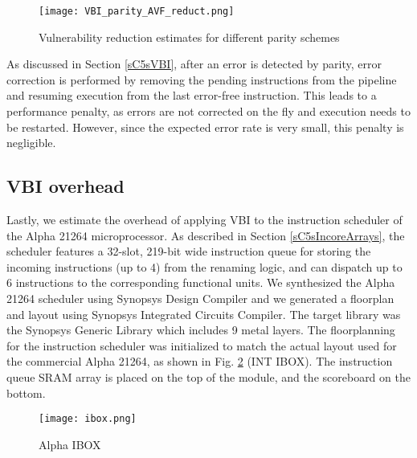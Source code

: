 \documentclass[12pt]{yalephd}
\begin{document}


\begin{figure}[!ht]%
\centering
\texttt{[image: VBI\_parity\_AVF\_reduct.png]}%
\caption{Vulnerability reduction estimates for different parity schemes}%
\label{sC5fVBIparityAVFreduct}%
\end{figure}

As discussed in Section \ref{sC5sVBI}, after an error is detected by parity, error correction is performed by removing the pending instructions from the pipeline and resuming execution from the last error-free instruction. This leads to a performance penalty, as errors are not corrected on the fly and execution needs to be restarted. However, since the expected error rate is very small, this penalty is negligible.

\subsection{VBI overhead}\label{sC5sVBIoverhead}

Lastly, we estimate the overhead of applying VBI to the instruction scheduler of the Alpha 21264 microprocessor. As described in Section \ref{sC5sIncoreArrays}, the scheduler features a 32-slot, 219-bit wide instruction queue for storing the incoming instructions (up to 4) from the renaming logic, and can dispatch up to 6 instructions to the corresponding functional units. We synthesized the Alpha 21264 scheduler using Synopsys Design Compiler and we generated a floorplan and layout using Synopsys Integrated Circuits Compiler. The target library was the Synopsys Generic Library which includes 9 metal layers. The floorplanning for the instruction scheduler was initialized to match the actual layout used for the commercial Alpha 21264, as shown in Fig. \ref{sC5fAlphaIBOX} (INT IBOX). The instruction queue SRAM array is placed on the top of the module, and the scoreboard on the bottom.

\begin{figure}[!ht]%
\centering
\texttt{[image: ibox.png]}%
\caption{Alpha IBOX \cite{matson1998circuit,buyuktosunoglu2002oldest}}%
\label{sC5fAlphaIBOX}%
\end{figure}
\end{document}
